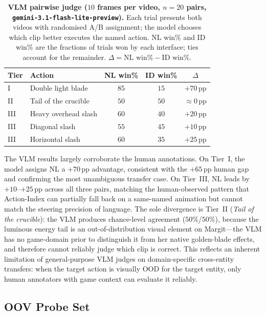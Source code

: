 \begin{table}[h]
  \caption{\textbf{VLM pairwise judge ($10$ frames per video, $n{=}20$ pairs, \texttt{gemini-3.1-flash-lite-preview}).}
    Each trial presents both videos with randomised A/B assignment; the model chooses which clip better executes the named action.
    NL win\% and ID win\% are the fractions of trials won by each interface; ties account for the remainder.
    $\Delta = \text{NL win\%} - \text{ID win\%}$.}
  \label{tab:vlm_pairwise}
  \centering
  \setlength{\tabcolsep}{6pt}
  \begin{tabular}{llccc}
    \toprule
    Tier & Action & NL win\% & ID win\% & $\Delta$ \\
    \midrule
    I   & Double light blade   & $85$ & $15$ & $+70$\,pp \\
    II  & Tail of the crucible & $50$ & $50$ & ${\approx}0$\,pp \\
    III & Heavy overhead slash & $60$ & $40$ & $+20$\,pp \\
    III & Diagonal slash       & $55$ & $45$ & $+10$\,pp \\
    III & Horizontal slash     & $60$ & $35$ & $+25$\,pp \\
    \bottomrule
  \end{tabular}
\end{table}

The VLM results largely corroborate the human annotations.
On Tier~I, the model assigns NL a $+70$\,pp advantage, consistent with the $+65$\,pp human gap and confirming the most unambiguous transfer case.
On Tier~III, NL leads by $+10$--$+25$\,pp across all three pairs, matching the human-observed pattern that Action-Index can partially fall back on a same-named animation but cannot match the steering precision of language.
The sole divergence is Tier~II (\textit{Tail of the crucible}): the VLM produces chance-level agreement ($50\%$/$50\%$), because the luminous energy tail is an out-of-distribution visual element on Margit---the VLM has no game-domain prior to distinguish it from her native golden-blade effects, and therefore cannot reliably judge which clip is correct.
This reflects an inherent limitation of general-purpose VLM judges on domain-specific cross-entity transfers: when the target action is visually OOD for the target entity, only human annotators with game context can evaluate it reliably.

\subsection{OOV Probe Set}
\label{app:oov_probes}

